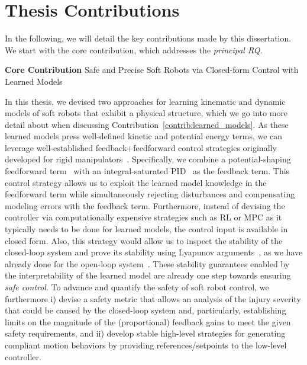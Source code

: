 \section{Thesis Contributions}\label{sec:introduction:contributions}

In the following, we will detail the key contributions made by this dissertation.
We start with the core contribution, which addresses the \emph{principal \gls{RQ}}.

\begin{titled-frame}{\textbf{Core Contribution}}
\noindent Safe and Precise Soft Robots via Closed-form Control with Learned Models
\end{titled-frame}
In this thesis, we devised two approaches for learning kinematic and dynamic models of soft robots that exhibit a physical structure, which we go into more detail about when discussing Contribution~\ref{contrib:learned_models}. As these learned models press well-defined kinetic and potential energy terms, we can leverage well-established feedback+feedforward control strategies originally developed for rigid manipulators~\cite{kelly1995tuning, kelly1996class, kelly1998global, sciavicco2012modelling}.
Specifically, we combine a potential-shaping feedforward term~\cite{della2023model} with an integral-saturated PID~\cite{pustina2022p} as the feedback term. This control strategy allows us to exploit the learned model knowledge in the feedforward term while simultaneously rejecting disturbances and compensating modeling errors with the feedback term.
Furthermore, instead of devising the controller via computationally expensive strategies such as \gls{RL} or \gls{MPC} as it typically needs to be done for learned models, the control input is available in closed form.
Also, this strategy would allow us to inspect the stability of the closed-loop system and prove its stability using Lyapunov arguments~\cite{khalil2002nonlinear}, as we have already done for the open-loop system~\cite{stolzle2024input}.
These stability guarantees enabled by the interpretability of the learned model are already one step towards ensuring \emph{safe control}. To advance and quantify the safety of soft robot control, we furthermore i) devise a safety metric that allows an analysis of the injury severity that could be caused by the closed-loop system and, particularly, establishing limits on the magnitude of the (proportional) feedback gains to meet the given safety requirements, and ii) develop stable high-level strategies for generating compliant motion behaviors by providing references/setpoints to the low-level controller.

